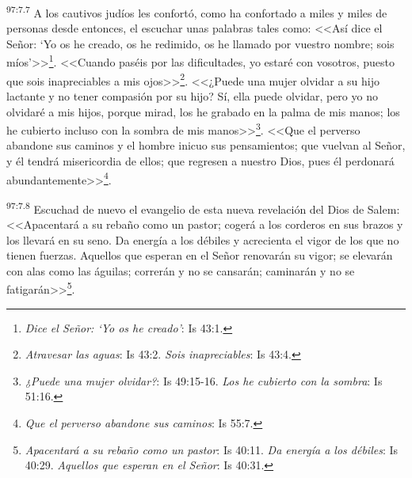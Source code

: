\par
\textsuperscript{97:7.7} A los cautivos judíos les confortó, como ha confortado a miles y miles de personas desde entonces, el escuchar unas palabras tales como: <<Así dice el Señor: `Yo os he creado, os he redimido, os he llamado por vuestro nombre; sois míos'>>\footnote{\textit{Dice el Señor: `Yo os he creado'}: Is 43:1.}. <<Cuando paséis por las dificultades, yo estaré con vosotros, puesto que sois inapreciables a mis ojos>>\footnote{\textit{Atravesar las aguas}: Is 43:2. \textit{Sois inapreciables}: Is 43:4.}. <<¿Puede una mujer olvidar a su hijo lactante y no tener compasión por su hijo? Sí, ella puede olvidar, pero yo no olvidaré a mis hijos, porque mirad, los he grabado en la palma de mis manos; los he cubierto incluso con la sombra de mis manos>>\footnote{\textit{¿Puede una mujer olvidar?}: Is 49:15-16. \textit{Los he cubierto con la sombra}: Is 51:16.}. <<Que el perverso abandone sus caminos y el hombre inicuo sus pensamientos; que vuelvan al Señor, y él tendrá misericordia de ellos; que regresen a nuestro Dios, pues él perdonará abundantemente>>\footnote{\textit{Que el perverso abandone sus caminos}: Is 55:7.}.

\par
\textsuperscript{97:7.8} Escuchad de nuevo el evangelio de esta nueva revelación del Dios de Salem: <<Apacentará a su rebaño como un pastor; cogerá a los corderos en sus brazos y los llevará en su seno. Da energía a los débiles y acrecienta el vigor de los que no tienen fuerzas. Aquellos que esperan en el Señor renovarán su vigor; se elevarán con alas como las águilas; correrán y no se cansarán; caminarán y no se fatigarán>>\footnote{\textit{Apacentará a su rebaño como un pastor}: Is 40:11. \textit{Da energía a los débiles}: Is 40:29. \textit{Aquellos que esperan en el Señor}: Is 40:31.}.

